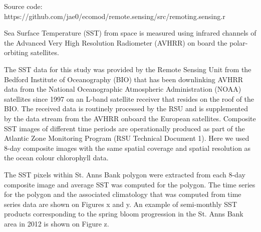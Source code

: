 \documentclass[letterpaper,portrait,12pt]{scrartcl}
\numberwithin{equation}{section}		%
\numberwithin{figure}{section}			%
\numberwithin{table}{section}				%
\begin{document}
Source code: https://github.com/jae0/ecomod/remote.sensing/src/remoting.sensing.r









\textcolor[rgb]{0.000,0.200,0.200}{Sea Surface Temperature (SST) from space is measured using infrared channels of the Advanced Very High Resolution Radiometer (AVHRR) on board the polar-orbiting satellites.}









\textcolor[rgb]{0.000,0.200,0.200}{The SST data for this study was provided by the Remote Sensing Unit from the Bedford Institute of Oceanography (BIO) that has been downlinking AVHRR data from the National Oceanographic Atmospheric Administration (NOAA) satellites since 1997 on an L-band satellite receiver that resides on the roof of the BIO. The received data is routinely processed by the RSU and is supplemented by the data stream from the AVHRR onboard the European satellites. Composite SST images of different time periods are operationally produced as part of the Atlantic Zone Monitoring Program (RSU Technical Document 1). Here we used 8-day composite images with the same spatial coverage and spatial resolution as the ocean colour chlorophyll data.}














The SST pixels within St. Anns Bank polygon were extracted from each 8-day composite image and average SST was computed for the polygon. The time series for the polygon and the associated climatology that was computed from time series data are shown on Figures x and y. An example of semi-monthly SST products corresponding to the spring bloom progression in the St. Anns Bank area in 2012 is shown on Figure z.
\end{document}
